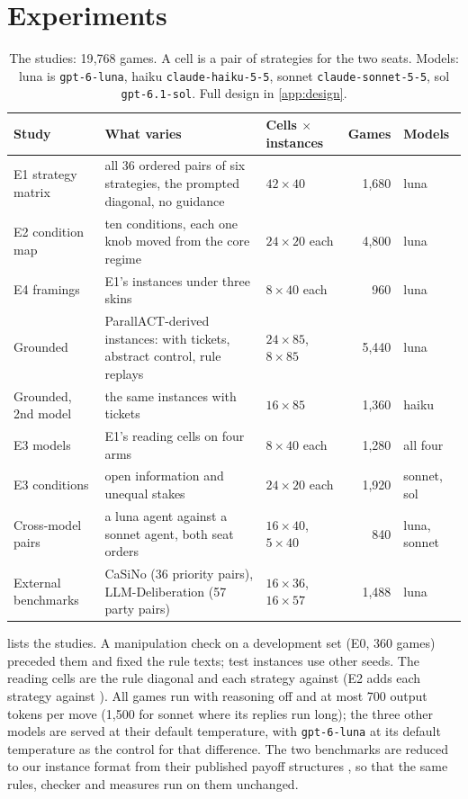 \section{Experiments}
\label{sec:design}

\begin{table}[t]
\caption{The studies: 19{,}768 games. A cell is a pair of strategies for the two seats. Models: luna is \texttt{gpt-6-luna}, haiku \texttt{claude-haiku-5-5}, sonnet \texttt{claude-sonnet-5-5}, sol \texttt{gpt-6.1-sol}. Full design in \cref{app:design}.}
\label{tab:studies}
\centering\footnotesize\setlength{\tabcolsep}{4pt}
\begin{tabular}{@{}l >{\raggedright\arraybackslash}p{7.6cm} l r l@{}}
\toprule
Study & What varies & Cells $\times$ instances & Games & Models \\
\midrule
E1 strategy matrix & all 36 ordered pairs of six strategies, the prompted diagonal, no guidance & $42 \times 40$ & 1{,}680 & luna \\
E2 condition map & ten conditions, each one knob moved from the core regime & $24 \times 20$ each & 4{,}800 & luna \\
E4 framings & E1's instances under three skins & $8 \times 40$ each & 960 & luna \\
Grounded & 85 ParallACT-derived instances: with tickets, abstract control, rule replays & $24 \times 85$, $8 \times 85$ & 5{,}440 & luna \\
Grounded, 2nd model & the same instances with tickets & $16 \times 85$ & 1{,}360 & haiku \\
E3 models & E1's reading cells on four arms & $8 \times 40$ each & 1{,}280 & all four \\
E3 conditions & open information and unequal stakes & $24 \times 20$ each & 1{,}920 & sonnet, sol \\
Cross-model pairs & a luna agent against a sonnet agent, both seat orders & $16 \times 40$, $5 \times 40$ & 840 & luna, sonnet \\
External benchmarks & CaSiNo (36 priority pairs), LLM-Deliberation (57 party pairs) & $16 \times 36$, $16 \times 57$ & 1{,}488 & luna \\
\bottomrule
\end{tabular}
\end{table}

 lists the studies. A manipulation check on a development set (E0, 360 games) preceded them and fixed the rule texts; test instances use other seeds. The reading cells are the rule diagonal and each strategy against \neutral{} (E2 adds each strategy against \competing). All games run with reasoning off and at most 700 output tokens per move (1{,}500 for sonnet where its replies run long); the three other models are served at their default temperature, with \texttt{gpt-6-luna} at its default temperature as the control for that difference. The two benchmarks are reduced to our instance format from their published payoff structures \citep{chawla2021casino,abdelnabi2024cooperation}, so that the same rules, checker and measures run on them unchanged.

